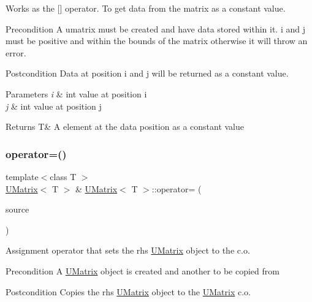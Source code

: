 Works as the \mbox{[}\mbox{]} operator. To get data from the matrix as a constant value. 

\begin{DoxyPrecond}{Precondition}
A umatrix must be created and have data stored within it. i and j must be positive and within the bounds of the matrix otherwise it will throw an error. 
\end{DoxyPrecond}
\begin{DoxyPostcond}{Postcondition}
Data at position i and j will be returned as a constant value.
\end{DoxyPostcond}

\begin{DoxyParams}{Parameters}
{\em i} & int value at position i \\
\hline
{\em j} & int value at position j \\
\hline
\end{DoxyParams}
\begin{DoxyReturn}{Returns}
T\& A element at the data position as a constant value 
\end{DoxyReturn}
\mbox{\label{class_u_matrix_a3f12f4544a460dd93dac8a883654310f}} 
\subsubsection{\texorpdfstring{operator=()}{operator=()}\hspace{0.1cm}{\footnotesize\ttfamily [1/2]}}
{\footnotesize\ttfamily template$<$class T $>$ \\
\mbox{\hyperlink{class_u_matrix}{U\+Matrix}}$<$ T $>$ \& \mbox{\hyperlink{class_u_matrix}{U\+Matrix}}$<$ T $>$\+::operator= (\begin{DoxyParamCaption}\item[{const \mbox{\hyperlink{class_u_matrix}{U\+Matrix}}$<$ T $>$ \&}]{source }\end{DoxyParamCaption})\hspace{0.3cm}{\ttfamily [virtual]}}



Assignment operator that sets the rhs \mbox{\hyperlink{class_u_matrix}{U\+Matrix}} object to the c.\+o. 

\begin{DoxyPrecond}{Precondition}
A \mbox{\hyperlink{class_u_matrix}{U\+Matrix}} object is created and another to be copied from 
\end{DoxyPrecond}
\begin{DoxyPostcond}{Postcondition}
Copies the rhs \mbox{\hyperlink{class_u_matrix}{U\+Matrix}} object to the \mbox{\hyperlink{class_u_matrix}{U\+Matrix}} c.\+o. 
\end{DoxyPostcond}

